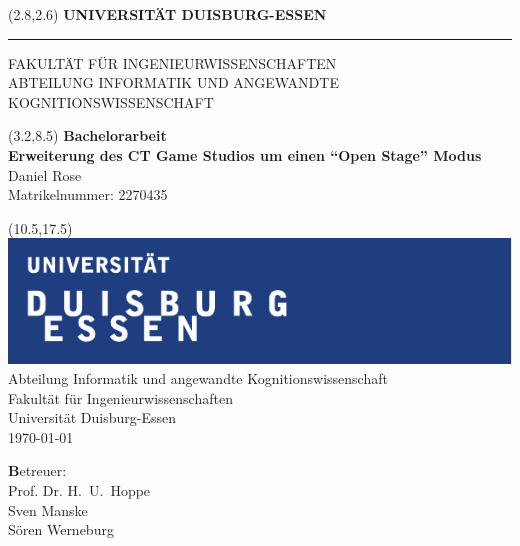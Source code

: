 \begin{titlepage}
\vspace*{-1cm}
\newlength{\links}
\setlength{\links}{0.9cm}
\setlength{\TPHorizModule}{1cm}
\setlength{\TPVertModule}{1cm}
\textblockorigin{0pt}{0pt}

\sffamily
\LARGE

\begin{textblock}{16.5}(2.8,2.6)
 \hspace*{-0.25cm} \textbf{UNIVERSITÄT DUISBURG-ESSEN} \\
 \hspace*{-1.15cm} \rule{5mm}{5mm} \hspace*{0.05cm} FAKULTÄT FÜR INGENIEURWISSENSCHAFTEN\\
 \large{}ABTEILUNG INFORMATIK UND ANGEWANDTE KOGNITIONSWISSENSCHAFT\\
\end{textblock}


\begin{textblock}{14.5}(3.2,8.5)
  \large
{ \textbf{Bachelorarbeit}} \\[1cm]
{\LARGE \Large\textbf{Erweiterung des CT Game Studios um einen \enquote{Open Stage} Modus}} \\[1.3cm]
Daniel Rose\\
Matrikelnummer: 2270435
\end{textblock}



\begin{textblock}{10}(10.5,17.5)
\includegraphics[scale=1.0]{unilogo.pdf}\\
\normalsize
\raggedleft
Abteilung Informatik und angewandte Kognitionswissenschaft \\
Fakultät für Ingenieurwissenschaften \\
Universität Duisburg-Essen \\[2ex]

\today\\[15ex]
\raggedright
{\textbf Betreuer:} \\
Prof. Dr. H.~U.~Hoppe\\
Sven Manske\\
Sören Werneburg\\
\end{textblock}

\end{titlepage}

